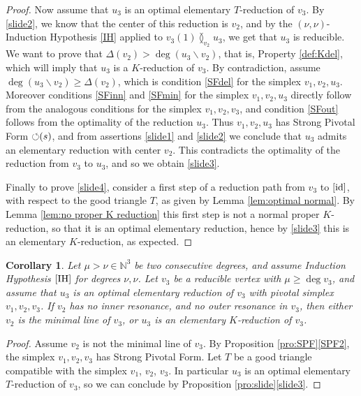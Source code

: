 \documentclass[reqno,oneside,11pt]{amsart}
\theoremstyle{plain}
\newtheorem{corollary}[theorem]{Corollary}
\theoremstyle{definition}
\newcommand{\N}{\mathbb{N}}
\newcommand{\PF}{\text{$\circlearrowleft$\!\,}}
\newcommand{\id}{\text{\rm id}}
\renewcommand{\ne}{\between}
\renewcommand{\ge}{\geqslant}
\begin{document}
\begin{proof}
Now assume that $u_3$ is an optimal elementary $T$-reduction of $v_3$.
By \ref{slide2}, we know that the center of this reduction is $v_2$,
and by the $(\nu,\nu)$-Induction Hypothesis \ref{IH} applied to $v_3(1) \ne_{v_2} u_3$,
we get that $u_3$ is reducible.
We want to prove that $\Delta(v_2) > \deg(u_3 \smallsetminus v_2)$, that is, Property \ref{def:Kdel}, which will imply that $u_3$ is a $K$-reduction of $v_3$.
By contradiction, assume $\deg(u_3 \smallsetminus v_2) \ge \Delta(v_2)$, which
is condition \ref{SFdel} for the simplex $v_1,v_2, u_3$.
Moreover conditions \ref{SFinn} and \ref{SFmin} for the simplex $v_1,v_2, u_3$
directly follow from the analogous conditions for the simplex $v_1,v_2, v_3$,
and condition \ref{SFout} follows from the optimality of the reduction $u_3$.
Thus $v_1,v_2, u_3$ has Strong Pivotal Form $\PF(s)$, and from assertions
\ref{slide1} and \ref{slide2} we conclude that $u_3$ admits an elementary
reduction with center $v_2$.
This contradicts the optimality of the reduction from $v_3$ to $u_3$, and so we obtain \ref{slide3}.

Finally to prove \ref{slide4}, consider a first step of a reduction path from
$v_3$ to $[\id]$,  with respect to the good triangle $T$, as given by Lemma
\ref{lem:optimal normal}.
By Lemma \ref{lem:no proper K reduction} this first step
is not a normal proper $K$-reduction, so that it is an optimal elementary
reduction, hence by
\ref{slide3} this is an elementary $K$-reduction, as expected.
\end{proof}

\begin{corollary} \label{cor:minimal or K}
Let $\mu > \nu \in \N^3$ be two consecutive degrees, and assume Induction Hypothesis $\ref{IH}$ for degrees $\nu, \nu$.
Let $v_3$ be a reducible vertex with $\mu \ge \deg v_3$, and assume that $u_3$ is an optimal elementary reduction of $v_3$ with pivotal simplex $v_1,v_2,v_3$.
If $v_2$ has no inner resonance, and no outer resonance in $v_3$, then either $v_2$ is the minimal line of $v_3$, or $u_3$ is an elementary $K$-reduction of $v_3$.
\end{corollary}

\begin{proof}
Assume $v_2$ is not the minimal line of $v_3$.
By Proposition \ref{pro:SPF}\ref{SPF2}, the simplex $v_1, v_2, v_3$ has Strong Pivotal Form.
Let $T$ be a good triangle compatible with the simplex $v_1$, $v_2$, $v_3$.
In particular $u_3$ is an optimal elementary $T$-reduction of $v_3$, so we can
conclude by Proposition \ref{pro:slide}\ref{slide3}.
\end{proof}
\end{document}
